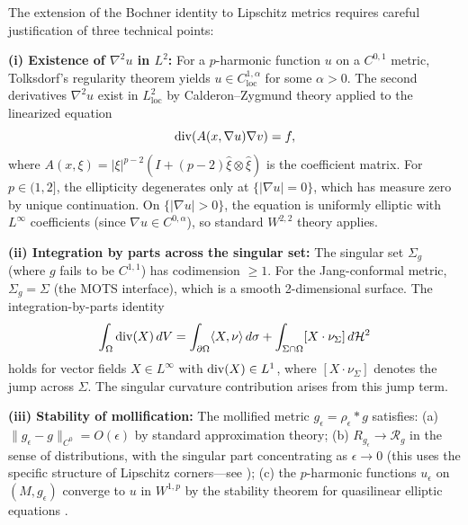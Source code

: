 \begin{remark}\label{rem:LipschitzBochnerJustification}
The extension of the Bochner identity to Lipschitz metrics requires careful justification of three technical points:

\textbf{(i) Existence of $\nabla^2 u$ in $L^2$:} For a $p$-harmonic function $u$ on a $C^{0,1}$ metric, Tolksdorf's regularity theorem \cite{tolksdorf1984} yields $u \in C^{1,\alpha}_{\mathrm{loc}}$ for some $\alpha > 0$. The second derivatives $\nabla^2 u$ exist in $L^2_{\mathrm{loc}}$ by Calderon--Zygmund theory applied to the linearized equation
\[
\mathrm{div}(A(x,\nabla u)\nabla v) = f,
\]
where $A(x,\xi) = |\xi|^{p-2}(I + (p-2)\hat\xi \otimes \hat\xi)$ is the coefficient matrix. For $p \in (1,2]$, the ellipticity degenerates only at $\{|\nabla u|=0\}$, which has measure zero by unique continuation. On $\{|\nabla u| > 0\}$, the equation is uniformly elliptic with $L^\infty$ coefficients (since $\nabla u \in C^{0,\alpha}$), so standard $W^{2,2}$ theory applies.

\textbf{(ii) Integration by parts across the singular set:} The singular set $\Sigma_g$ (where $g$ fails to be $C^{1,1}$) has codimension $\ge 1$. For the Jang-conformal metric, $\Sigma_g = \Sigma$ (the MOTS interface), which is a smooth 2-dimensional surface. The integration-by-parts identity
\[
\int_\Omega \mathrm{div}(X) \, dV = \int_{\partial\Omega} \langle X, \nu \rangle \, d\sigma + \int_{\Sigma \cap \Omega} [X \cdot \nu_\Sigma] \, d\mathcal{H}^2
\]
holds for vector fields $X \in L^\infty$ with $\mathrm{div}(X) \in L^1$, where $[X\cdot\nu_\Sigma]$ denotes the jump across $\Sigma$. The singular curvature contribution arises from this jump term.

\textbf{(iii) Stability of mollification:} The mollified metric $g_\epsilon = \rho_\epsilon * g$ satisfies: (a) $\|g_\epsilon - g\|_{C^0} = O(\epsilon)$ by standard approximation theory; (b) $R_{g_\epsilon} \to \mathcal{R}_g$ in the sense of distributions, with the singular part concentrating as $\epsilon \to 0$ (this uses the specific structure of Lipschitz corners---see \cite{lee2019}); (c) the $p$-harmonic functions $u_\epsilon$ on $(M,g_\epsilon)$ converge to $u$ in $W^{1,p}$ by the stability theorem for quasilinear elliptic equations \cite{lindqvist2017}.
\end{remark}

